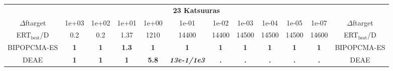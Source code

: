 \begin{tabular}{cccccccccccc}
 & \multicolumn{10}{c}{{\normalsize \textbf{23 Katsuuras}}}\\
$\Delta$ftarget& 1e+03& 1e+02& 1e+01& 1e+00& 1e-01& 1e-02& 1e-03& 1e-04& 1e-05& 1e-07 & $\Delta$ftarget \\
ERT$_{\textrm{best}}$/D& 0.2& 0.2& 1.37& 1210& 14400& 14400& 14500& 14500& 14500& 14600 & ERT$_{\textrm{best}}$/D \\
\hline
BIPOPCMA-ES & \textbf{1} & \textbf{1} & \textbf{1.3} & \textbf{1} & \textbf{1} & \textbf{1} & \textbf{1} & \textbf{1} & \textbf{1} & \textbf{1} & BIPOPCMA-ES \cite{add_an_entry_for_BIPOPCMA-ES_in_bbob.bib}\\
DEAE & \textbf{1} & \textbf{1} & \textbf{1} & \textbf{5.8} & \textbf{\textit{13e-1}\textit{/1e3}} & \textbf{.} & \textbf{.} & \textbf{.} & \textbf{.} & \textbf{.} & DEAE \cite{add_an_entry_for_DEAE_in_bbob.bib}
\end{tabular}
